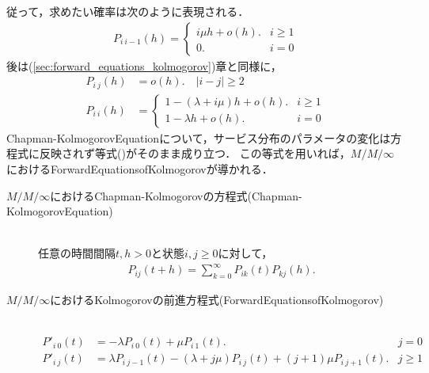 \documentclass[a4j,papersize,disablejfam,slide,14pt]{jsarticle}
\begin{document}
    従って，求めたい確率は次のように表現される．
    \begin{align}
        P_{i\ i-1}(h) =
        \begin{cases}
        	i \mu h + o(h). & i \geq 1 \\
            0. & i = 0
        \end{cases}
    \end{align}
    後は(\ref{sec:forward_equations_kolmogorov})章と同様に，
    \begin{align}
    	P_{i\ j}(h) &= o(h).\quad |i - j| \geq 2\\
        P_{i\ i}(h) &=
        \begin{cases}
        	1 - (\lambda + i \mu) h + o(h). & i \geq 1 \\
            1 - \lambda h + o(h). & i = 0
        \end{cases}
    \end{align}
    {\rm Chapman-Kolmogorov\quad Equation}について，サービス分布のパラメータの変化は方程式に反映されず等式()がそのまま成り立つ．
    この等式を用いれば，$M/M/\infty$における{\rm Forward\quad Equations\quad of\quad Kolmogorov}が導かれる．
    \begin{screen}
    	\begin{description}
        	\item[$M/M/\infty$における{\rm Chapman-Kolmogorov}の方程式{\rm (Chapman-Kolmogorov\quad Equation)}]\mbox{}\\
            	任意の時間間隔$t,h > 0$と状態$i,j \geq 0$に対して，
                \begin{align}
            		P_{ij}(t+h) = \sum_{k=0}^{\infty} P_{ik}(t)P_{kj}(h).
                \end{align}
            
        	\item[$M/M/\infty$における{\rm Kolmogorov}の前進方程式{\rm (Forward\quad Equations\quad of\quad Kolmogorov)}]\mbox{}\\
    			\begin{align}
    				P'_{i\ 0}(t) &= -\lambda P_{i\ 0}(t) + \mu P_{i\ 1}(t). & j = 0\\
                    P'_{i\ j}(t) &= \lambda P_{i\ j-1}(t) - (\lambda + j\mu) P_{i\ j}(t) + (j+1)\mu P_{i\ j+1}(t). & j \geq 1\\
        		\end{align}
        \end{description}
    \end{screen}
\end{document}

